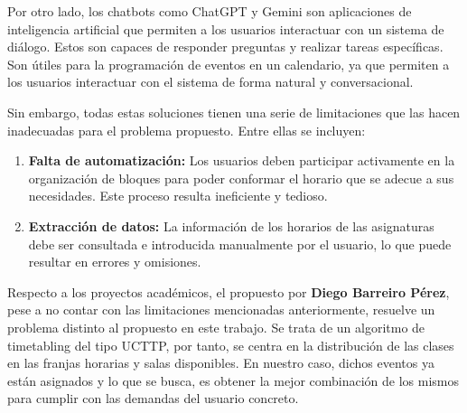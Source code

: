 Por otro lado, los chatbots como ChatGPT y Gemini son aplicaciones de inteligencia artificial que permiten a los usuarios interactuar con un sistema de diálogo. Estos son capaces de responder preguntas y realizar tareas específicas. Son útiles para la programación de eventos en un calendario, ya que permiten a los usuarios interactuar con el sistema de forma natural y conversacional.\newline

Sin embargo, todas estas soluciones tienen una serie de limitaciones que las hacen inadecuadas para el problema propuesto. Entre ellas se incluyen:

\begin{enumerate}
    \item \textbf{Falta de automatización:} Los usuarios deben participar activamente en la organización de bloques para poder conformar el horario que se adecue a sus necesidades. Este proceso resulta ineficiente y tedioso.
    \item \textbf{Extracción de datos:} La información de los horarios de las asignaturas debe ser consultada e introducida manualmente por el usuario, lo que puede resultar en errores y omisiones.
\end{enumerate}

Respecto a los proyectos académicos, el propuesto por \textbf{Diego Barreiro Pérez}, pese a no contar con las limitaciones mencionadas anteriormente, resuelve un problema distinto al propuesto en este trabajo. Se trata de un algoritmo de timetabling del tipo UCTTP, por tanto, se centra en la distribución de las clases en las franjas horarias y salas disponibles. En nuestro caso, dichos eventos ya están asignados y lo que se busca, es obtener la mejor combinación de los mismos para cumplir con las demandas del usuario concreto.\newline
